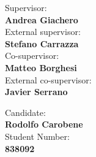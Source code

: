 \begin{titlepage}
\begin{minipage}[t]{0.47\textwidth}
	{Supervisor:\\ \large{\bf Andrea Giachero}}
	\vspace{0.5cm}
	{\\External supervisor:\\ \large{\bf Stefano Carrazza}}
	\vspace{0.5cm}
	{\\Co-supervisor:\\ \large{\bf Matteo Borghesi}}
	\vspace{0.5cm}
	{\\External co-supervisor:\\ \large{\bf Javier Serrano}}
\end{minipage}
\hfill\begin{minipage}[t]{0.47\textwidth}\raggedleft
	{Candidate:\\ \large{\bf Rodolfo Carobene}}
	\vspace{0.5cm}
	{\\Student Number: \\\large{\bf 838092}}
\end{minipage}

\vspace{30mm}

\end{titlepage}

\restoregeometry

\clearpage %
\begingroup
  \pagestyle{empty}
  \null
  \newpage
\endgroup



